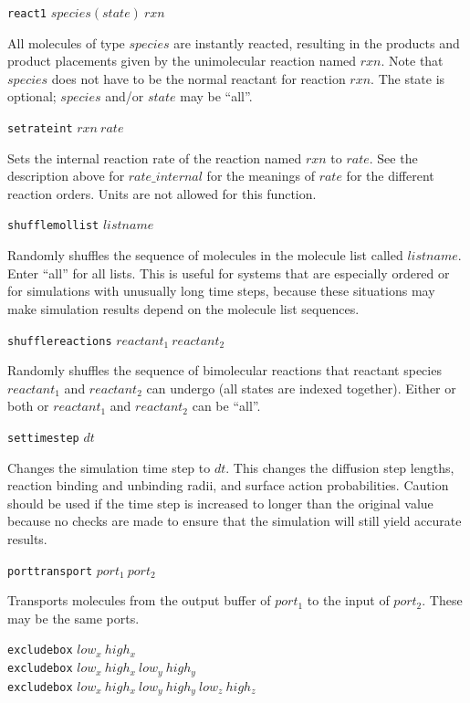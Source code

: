 \documentclass {scrbook}
\newcommand {\ttt} {\texttt}
\begin{document}
\begin{description}
\item{\ttt{react1} $species(state)\ rxn$}

All molecules of type $species$ are instantly reacted, resulting in the products and product placements given by the unimolecular reaction named $rxn$. Note that $species$ does not have to be the normal reactant for reaction $rxn$. The state is optional; $species$ and/or $state$ may be ``all''.

\item{\ttt{setrateint} $rxn\ rate$}

Sets the internal reaction rate of the reaction named $rxn$ to $rate$. See the description above for $rate\_internal$ for the meanings of $rate$ for the different reaction orders. Units are not allowed for this function.

\item{\ttt{shufflemollist} $listname$}

Randomly shuffles the sequence of molecules in the molecule list called $listname$. Enter ``all'' for all lists. This is useful for systems that are especially ordered or for simulations with unusually long time steps, because these situations may make simulation results depend on the molecule list sequences.

\item{\ttt{shufflereactions} $reactant_1\ reactant_2$}

Randomly shuffles the sequence of bimolecular reactions that reactant species $reactant_1$ and $reactant_2$ can undergo (all states are indexed together). Either or both or $reactant_1$ and $reactant_2$ can be ``all''.

\item{\ttt{settimestep} $dt$}

Changes the simulation time step to $dt$. This changes the diffusion step lengths, reaction binding and unbinding radii, and surface action probabilities. Caution should be used if the time step is increased to longer than the original value because no checks are made to ensure that the simulation will still yield accurate results.

\item{\ttt{porttransport} $port_1\ port_2$}

Transports molecules from the output buffer of $port_1$ to the input of $port_2$. These may be the same ports.

\item{\ttt{excludebox} $low_x\ high_x$\\
\ttt{excludebox} $low_x\ high_x\ low_y\ high_y$\\
\ttt{excludebox} $low_x\ high_x\ low_y\ high_y\ low_z\ high_z$}


\end{description}
\end{document}
